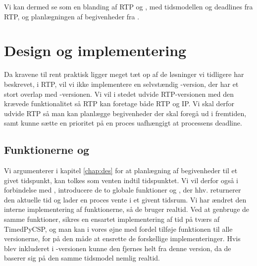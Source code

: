 Vi kan dermed se \is som en blanding af RTP og \des, med tidsmodellen og deadlines fra RTP, og planlægningen af begivenheder fra \des. 



\section{Design og implementering} 

Da kravene til \is rent praktisk ligger meget tæt op af de løsninger vi tidligere har beskrevet, i RTP, vil vi ikke implementere en selvstændig \ip-version, der har et stort overlap med -versionen. Vi vil i stedet udvide RTP-versionen med den krævede funktionalitet så RTP kan foretage både RTP og IP.
Vi skal derfor udvide RTP så man kan planlægge begivenheder der skal foregå ud i fremtiden, samt kunne sætte en prioritet på en proces uafhængigt at processens deadline. 


\subsection{Funktionerne  og }

Vi argumenterer i kapitel \ref{chap:des} for at planlægning af begivenheder til et givet tidspunkt, kan tolkes som venten indtil tidspunktet. Vi vil derfor også i forbindelse med \ip, introducere de to globale funktioner  og , der hhv. returnerer den aktuelle tid og lader en proces vente i et givent tidsrum. Vi har ændret den interne implementering af funktionerne, så de bruger realtid. Ved at genbruge de samme funktioner, sikres en ensartet implementering af tid på tværs af TimedPyCSP, og man kan i vores øjne med fordel tilføje funktionen  til alle \pycsp versionerne, for på den måde at ensrette de forskellige implementeringer. Hvis  blev inkluderet i -versionen kunne den fjernes helt fra denne version, da de baserer sig på den samme tidsmodel nemlig realtid.

